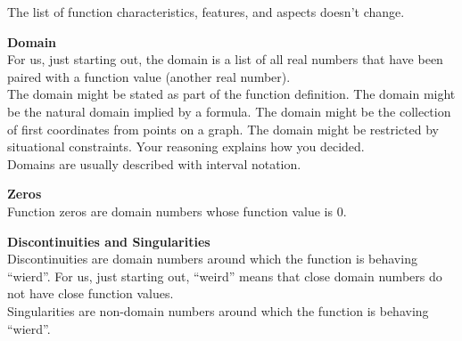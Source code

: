 \documentclass{ximera}
\begin{document}
The list of function characteristics, features, and aspects doesn't change. \\





\begin{explanation}  \textbf{\textcolor{blue!75!black}{Domain}} \\

For us, just starting out, the domain is a list of all real numbers that have been paired with a function value (another real number). \\


The domain might be stated as part of the function definition. The domain might be the natural domain implied by a formula.  The domain might be the collection of first coordinates from points on a graph.  The domain might be restricted by situational constraints. Your reasoning explains how you decided. \\


Domains are usually described with interval notation.

\end{explanation}











\begin{explanation}  \textbf{\textcolor{blue!75!black}{Zeros}} \\

Function zeros are domain numbers whose function value is $0$.

\end{explanation}












\begin{explanation}  \textbf{\textcolor{blue!75!black}{Discontinuities and Singularities}} \\

Discontinuities are domain numbers around which the function is behaving ``wierd''. For us, just starting out, ``weird'' means that close domain numbers do not have close function values.   \\




Singularities are non-domain numbers around which the function is behaving ``wierd''.   \\


\end{explanation}
\end{document}

